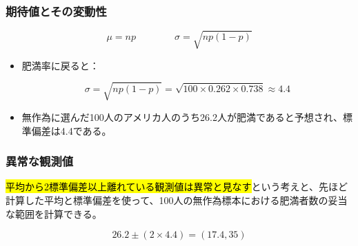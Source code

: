 
\begin{frame}
\frametitle{期待値とその変動性}

{\[ \mu = np \qquad \qquad \sigma = \sqrt{np(1-p)} \] }

\begin{itemize}

\item 肥満率に戻ると：

\[ \sigma = \sqrt{np(1-p)} = \sqrt{100 \times 0.262 \times 0.738} \approx  4.4\]

\item 無作為に選んだ100人のアメリカ人のうち26.2人が肥満であると予想され、標準偏差は4.4である。

\end{itemize}


\end{frame}


\begin{frame}
\frametitle{異常な観測値}

\hl{平均から2標準偏差以上離れている観測値は異常と見なす}という考えと、先ほど計算した平均と標準偏差を使って、100人の無作為標本における肥満者数の妥当な範囲を計算できる。

\[ 26.2 \pm (2 \times 4.4) = (17.4, 35) \]

\end{frame}


